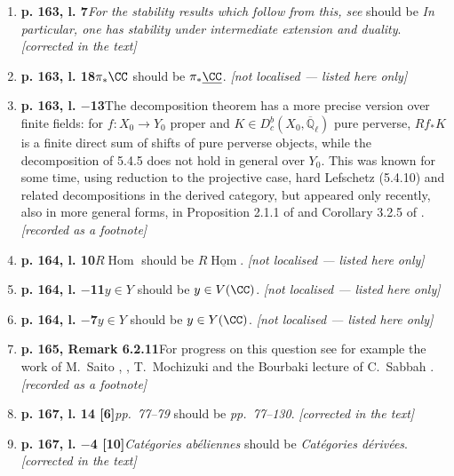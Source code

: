 \documentclass[12pt,oneside]{amsbook}
\theoremstyle{plain}
\theoremstyle{definition}
\newcommand{\Qlb}{\overline{\mathbb{Q}}_{\ell}}
\newcommand{\Dbc}{D^{b}_{c}}
\DeclareMathOperator{\Hom}{Hom}
\begin{document}
\begin{enumerate}[label={\arabic*.},leftmargin=2.6em,itemsep=4pt]
\item \textbf{p. 163, l. 7}\quad \emph{For the stability results which follow from this, see} should be \emph{In particular, one has stability under intermediate extension and duality}. \hfill\newline \textsl{[corrected in the text]}
\item \textbf{p. 163, l. 18}\quad $\pi_{*}\CC$ should be $\pi_{*}\underline{\CC}$. \hfill\newline \textsl{[not localised --- listed here only]}
\item \textbf{p. 163, l. $-$13}\quad The decomposition theorem has a more precise version over finite fields: for $f:X_{0}\to Y_{0}$ proper and $K\in\Dbc(X_{0},\Qlb)$ pure perverse, $Rf_{*}K$ is a finite direct sum of shifts of pure perverse objects, while the decomposition of 5.4.5 does not hold in general over $Y_{0}$. This was known for some time, using reduction to the projective case, hard Lefschetz (5.4.10) and related decompositions in the derived category, but appeared only recently, also in more general forms, in Proposition 2.1.1 of \cite{dC15} and Corollary 3.2.5 of \cite{SZ16}. \hfill\newline \textsl{[recorded as a footnote]}
\item \textbf{p. 164, l. 10}\quad $R\Hom$ should be $R\underline{\Hom}$. \hfill\newline \textsl{[not localised --- listed here only]}
\item \textbf{p. 164, l. $-$11}\quad $y\in Y$ should be $y\in V(\CC)$. \hfill\newline \textsl{[not localised --- listed here only]}
\item \textbf{p. 164, l. $-$7}\quad $y\in Y$ should be $y\in Y(\CC)$. \hfill\newline \textsl{[not localised --- listed here only]}
\item \textbf{p. 165, Remark 6.2.11}\quad For progress on this question see for example the work of M.~Saito \cite{Sai88}, \cite{Sai90}, T.~Mochizuki \cite{Moc15} and the Bourbaki lecture of C.~Sabbah \cite{Sab13}. \hfill\newline \textsl{[recorded as a footnote]}
\item \textbf{p. 167, l. 14 [6]}\quad \emph{pp.~77--79} should be \emph{pp.~77--130}. \hfill\newline \textsl{[corrected in the text]}
\item \textbf{p. 167, l. $-$4 [10]}\quad \emph{Catégories abéliennes} should be \emph{Catégories dérivées}. \hfill\newline \textsl{[corrected in the text]}
\end{enumerate}
\end{document}
